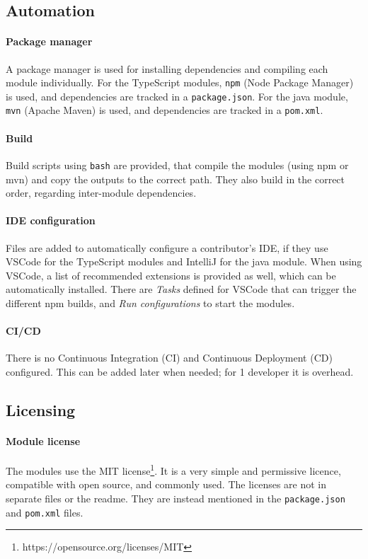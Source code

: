 \subsection{Automation}

\paragraph{Package manager}
A package manager is used for installing dependencies and compiling each module individually.
For the TypeScript modules, \texttt{npm} (Node Package Manager) is used, and dependencies are tracked in a \texttt{package.json}.
For the java module, \texttt{mvn} (Apache Maven) is used, and dependencies are tracked in a \texttt{pom.xml}.

\paragraph{Build}
Build scripts using \texttt{bash} are provided, that compile the modules (using npm or mvn) and copy the outputs to the correct path.
They also build in the correct order, regarding inter-module dependencies.

\paragraph{IDE configuration}
Files are added to automatically configure a contributor's \acrshort{IDE}, if they use \gls{VSCode} for the TypeScript modules and IntelliJ for the java module.
When using \gls{VSCode}, a list of recommended extensions is provided as well, which can be automatically installed.
There are \textit{Tasks} defined for \gls{VSCode} that can trigger the different npm builds, and \textit{Run configurations} to start the modules.

\paragraph{CI/CD}
There is no Continuous Integration (CI) and Continuous Deployment (CD) configured.
This can be added later when needed; for 1 developer it is overhead.

\subsection{Licensing}

\paragraph{Module license}
The modules use the MIT license\footnote{https://opensource.org/licenses/MIT}.
It is a very simple and permissive licence, compatible with \gls{open source}, and commonly used.
The licenses are not in separate files or the readme.
They are instead mentioned in the \texttt{package.json} and \texttt{pom.xml} files.

